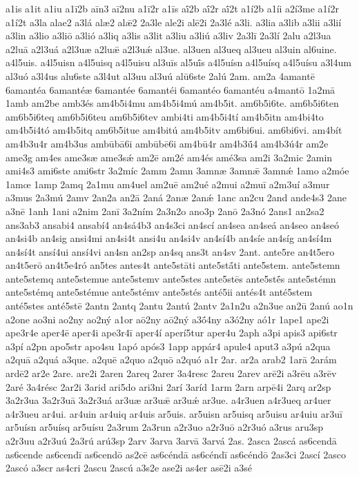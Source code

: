 {a1is
a1it
a1iu
a1ī2b
aīn3
aī2nu
a1ī2r
a1īs
aī́2b
aī́2r
aī́2t
a1í2b
a1íi
a2í3me
a1í2r
a1í2t
a3la
alae2
a3lá
alæ2
alǣ2
2a3le
ale2i
alē2i
2a3lé
a3li.
a3lia
a3lib
a3lii
a3lií
a3lin
a3lio
a3liō
a3lió
a3liq
a3lis
a3lit
a3liu
a3liú
a3liv
2a3lī
2a3lí
2alu
a2l3ua
a2luā
a2l3uá
a2l3uæ
a2luǣ
a2l3uǽ
al3ue.
al3uen
al3ueq
al3ueu
al3uin
al6uine.
a4l5uis.
a4l5uisn
a4l5uisq
a4l5uisu
al3uīs
al5uī́s
a4l5uísn
a4l5uísq
a4l5uísu
a3l4um
al3uó
a3l4us
alu6ste
a3l4ut
al3uu
al3uú
alū6ste
2alú
2am.
am2a
4amantē
6amantéa
6amantéæ
6amantée
6amantéi
6amantéo
6amantéu
a4mantō
1a2mā
1amb
am2be
amb3és
am4b5i4mu
am4b5i4mú
am4b5it.
am6b5i6te.
am6b5i6ten
am6b5i6teq
am6b5i6teu
am6b5i6tev
ambi4ti
am4b5i4tí
am4b5itn
am4bi4to
am4b5i4tó
am4b5itq
am6b5itue
am4bitú
am4b5itv
am6bi6ui.
am6bi6vi.
am4bít
am4b3u4r
am4b3us
ambūbā6i
ambūbē6i
am4bū4r
am4b3ū́4
am4b3ú4r
am2e
ame3g
am4es
ame3sæ
ame3sǽ
am2ē
am2é
am4és
amé3sa
am2i
3a2mic
2amin
ami4s3
ami6ste
ami6str
3a2míc
2amm
2amn
3amnæ
3amnǣ
3amnǽ
1amo
a2móe
1amœ
1amp
2amq
2a1mu
am4uel
am2uē
am2ué
a2mui
a2muī
a2m3uí
a3mur
a3mus
2a3mú
2amv
2an2a
an2ā
2aná
2anæ
2anǽ
1anc
an2cu
2and
ande4s3
2ane
a3nē
1anh
1ani
a2nim
2anī
3a2ním
2a3n2o
ano3p
2anō
2a3nó
2ans1
an2sa2
ans3ab3
ansabi4
ansabí4
an4sá4b3
an4s3ci
an4scí
an4sea
an4seá
an4seo
an4seó
an4si4b
an4sig
ansi4mi
an4si4t
ansi4u
an4si4v
an4sí4b
an4síe
an4síg
an4sí4m
an4sí4t
ansí4ui
ansí4vi
an4sn
an2sp
an4sq
ans3t
an4sv
2ant.
ante5re
an4t5ero
an4t5erō
an4t5e4ró
an5tes
antes4t
ante5stāti
ante5stā́ti
ante5stem.
ante5stemn
ante5stemq
ante5stemue
ante5stemv
ante5stes
ante5stēs
ante5stḗs
ante5stémn
ante5stémq
ante5stémue
ante5stémv
ante5stés
anté5ii
antés4t
anté5stem
anté5stes
anté5stē
2antn
2antq
2antu
2antú
2antv
2a1n2u
a2n3ue
an2ū
2anú
ao1n
a2one
ao3ni
ao2ny
ao2ný
a1or
aō2ny
aō2ný
a3ṓ4ny
a3ó2ny
aó1r
1ape1
ape2i
ape3r4e
aper4ē
aper4i
ape3r4ī
aper4í
aperí5tur
aper4u
2aph
a3pi
apis3
api6str
a3pí
a2pn
apo5str
apo4su
1apó
após3
1app
appár4
apule4
aput3
a3pú
a2qua
a2quā
a2quá
a3que.
a2quē
a2quo
a2quō
a2quó
a1r
2ar.
ar2a
arab2
1arā
2arám
ardē2
ar2e
2are.
are2i
2aren
2areq
2arer
3a4resc
2areu
2arev
arē2i
a3rēu
a3rēv
2aré
3a4résc
2ar2i
3arid
ari5do
ari3ni
2arí
3aríd
1arm
2arn
arpē4i
2arq
ar2sp
3a2r3ua
3a2r3uā
3a2r3uá
ar3uæ
ar3uǣ
ar3uǽ
ar3ue.
a4r3uen
a4r3ueq
ar4uer
a4r3ueu
ar4ui.
ar4uin
ar4uiq
ar4uis
ar5uis.
ar5uisn
ar5uisq
ar5uisu
ar4uiu
ar3uī
ar5uísn
ar5uísq
ar5uísu
2a3rum
2a3run
a2r3uo
a2r3uō
a2r3uó
a3rus
aru3sp
a2r3uu
a2r3uú
2a3rú
arú3sp
2arv
3arva
3arvā
3arvá
2as.
2asca
2ascá
as6cendā
as6cende
as6cendī
as6cendō
as2cē
as6céndā
as6céndī
as6céndō
2as3ci
2ascí
2asco
2ascó
a3scr
as4cri
2ascu
2ascú
a3s2e
ase2i
as4er
asē2i
a3sé
}
